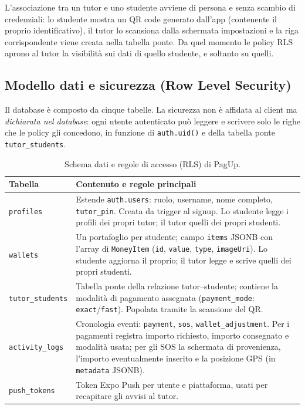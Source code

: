 \documentclass[11pt,a4paper]{article}
\begin{document}
L'associazione tra un tutor e uno studente avviene di persona e senza scambio di credenziali: lo
studente mostra un QR code generato dall'app (contenente il proprio identificativo), il tutor lo
scansiona dalla schermata impostazioni e la riga corrispondente viene creata nella tabella ponte.
Da quel momento le policy RLS aprono al tutor la visibilit\`a sui dati di quello studente, e
soltanto su quelli.

\subsection{Modello dati e sicurezza (Row Level Security)}

Il database \`e composto da cinque tabelle. La sicurezza non \`e affidata al client ma
\emph{dichiarata nel database}: ogni utente autenticato pu\`o leggere e scrivere solo le righe che
le policy gli concedono, in funzione di \texttt{auth.uid()} e della tabella ponte
\texttt{tutor\_students}.

\begin{table}[H]
\centering
\renewcommand{\arraystretch}{1.25}
\begin{tabularx}{\textwidth}{@{}p{3.0cm}X@{}}
\toprule
\textbf{Tabella} & \textbf{Contenuto e regole principali} \\
\midrule
\texttt{profiles} & Estende \texttt{auth.users}: ruolo, username, nome completo, \texttt{tutor\_pin}. Creata da trigger al signup. Lo studente legge i profili dei propri tutor; il tutor quelli dei propri studenti. \\
\texttt{wallets} & Un portafoglio per studente; campo \texttt{items} JSONB con l'array di \texttt{MoneyItem} (\texttt{id}, \texttt{value}, \texttt{type}, \texttt{imageUri}). Lo studente aggiorna il proprio; il tutor legge e scrive quelli dei propri studenti. \\
\texttt{tutor\_students} & Tabella ponte della relazione tutor--studente; contiene la modalit\`a di pagamento assegnata (\texttt{payment\_mode}: \texttt{exact}/\texttt{fast}). Popolata tramite la scansione del QR. \\
\texttt{activity\_logs} & Cronologia eventi: \texttt{payment}, \texttt{sos}, \texttt{wallet\_adjustment}. Per i pagamenti registra importo richiesto, importo consegnato e modalit\`a usata; per gli SOS la schermata di provenienza, l'importo eventualmente inserito e la posizione GPS (in \texttt{metadata} JSONB). \\
\texttt{push\_tokens} & Token Expo Push per utente e piattaforma, usati per recapitare gli avvisi al tutor. \\
\bottomrule
\end{tabularx}
\caption{Schema dati e regole di accesso (RLS) di PagUp.}
\end{table}
\end{document}
